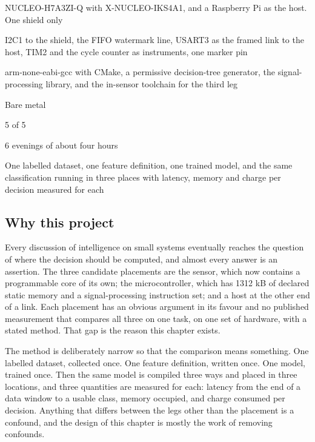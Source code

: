
\begin{keyfacts}
\item[Board] NUCLEO-H7A3ZI-Q with X-NUCLEO-IKS4A1, and a Raspberry Pi as the host. One shield only
\item[Peripherals] I2C1 to the shield, the FIFO watermark line, USART3 as the framed link to the host, TIM2 and the cycle counter as instruments, one marker pin
\item[Toolchain] arm-none-eabi-gcc with CMake, a permissive decision-tree generator, the signal-processing library, and the in-sensor toolchain for the third leg
\item[Operating system] Bare metal
\item[Difficulty] 5 of 5
\item[Effort] 6 evenings of about four hours
\item[Deliverable] One labelled dataset, one feature definition, one trained model, and the same classification running in three places with latency, memory and charge per decision measured for each
\end{keyfacts}

\subsection*{Why this project}

Every discussion of intelligence on small systems eventually reaches the
question of where the decision should be computed, and almost every answer is an
assertion. The three candidate placements are the sensor, which now contains a
programmable core of its own; the microcontroller, which has 1312 kB of declared
static memory and a signal-processing instruction set; and a host at the other
end of a link. Each
placement has an obvious argument in its favour and no published measurement
that compares all three on one task, on one set of hardware, with a stated
method. That gap is the reason this chapter exists.

The method is deliberately narrow so that the comparison means something. One
labelled dataset, collected once. One feature definition, written once. One
model, trained once. Then the same model is compiled three ways and placed in
three locations, and three quantities are measured for each: latency from the
end of a data window to a usable class, memory occupied, and charge consumed per
decision. Anything that differs between the legs other than the placement is a
confound, and the design of this chapter is mostly the work of removing
confounds.

